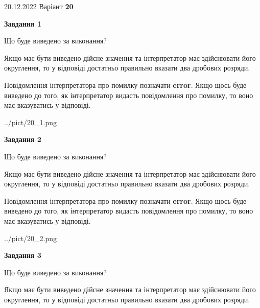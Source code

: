 \documentclass[12pt, ukrainian]{article}
\begin{document}
{20.12.2022 Варіант \No \textbf { 20 }\par}
{
\begin {Large}

{\begin {center}\textbf{Завдання 1}\end {center}}\par
Що буде виведено за виконання? \par

Якщо має бути виведено дійсне значення та інтерпретатор має здійснювати його округлення, 
то у відповіді достатньо правильно вказати два дробових розряди.

Повідомлення інтерпретатора про помилку позначати \textbf{error}.
Якщо щось буде виведено до того, як інтерпретатор видасть повідомлення про помилку, 
то воно має вказуватись у відповіді. \par

\begin{center}
	{../pict/20_1.png}
\end{center}
\newpage

{\begin {center}\textbf{Завдання 2}\end {center}}\par
Що буде виведено за виконання? \par

Якщо має бути виведено дійсне значення та інтерпретатор має здійснювати його округлення, 
то у відповіді достатньо правильно вказати два дробових розряди.

Повідомлення інтерпретатора про помилку позначати \textbf{error}.
Якщо щось буде виведено до того, як інтерпретатор видасть повідомлення про помилку, 
то воно має вказуватись у відповіді. \par

\begin{center}
	{../pict/20_2.png}
\end{center}
\newpage

{\begin {center}\textbf{Завдання 3}\end {center}}\par
Що буде виведено за виконання? \par

Якщо має бути виведено дійсне значення та інтерпретатор має здійснювати його округлення, 
то у відповіді достатньо правильно вказати два дробових розряди.


\end{Large}}
\end{document}
